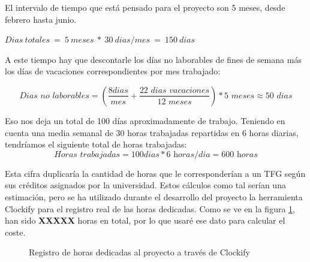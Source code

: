 El intervalo de tiempo que está pensado para el proyecto son 5 meses, desde febrero hasta junio. 

\begin{center}
    $Dias\ totales\ =\ 5\ meses\ *\ 30\ dias / mes\ =\ 150\ dias$    
\end{center}

A este tiempo hay que descontarle los días no laborables de fines de semana más los días de vacaciones correspondientes por mes trabajado:

\begin{equation*}
    \textit{Dias no laborables} = \left( \frac{8 \textit{dias}}{mes} + \frac{22 \textit{ dias vacaciones}}{12 \textit{ meses}}\right) * 5 \textit{ meses} \approx 50 \textit{ dias}
\end{equation*}

Eso nos deja un total de 100 días aproximadamente de trabajo. Teniendo en cuenta una media semanal de 30 horas trabajadas repartidas en 6 horas diarias, tendríamos el siguiente total de horas trabajadas:
\begin{equation*}
    \textit{Horas trabajadas} = 100 \textit{dias} * 6 \textit{ horas/dia} = 600 \textit{ horas}
\end{equation*}

Esta cifra duplicaría la cantidad de horas que le corresponderían a un TFG según sus créditos asignados por la universidad. Estos cálculos como tal serían una estimación, pero se ha utilizado durante el desarrollo del proyecto la herramienta Clockify para el registro real de las horas dedicadas. Como se ve en la figura \ref{fig:clockify}, han sido \textbf{XXXXX} horas en total,
por lo que usaré ese dato para calcular el coste.

\begin{figure}[h!]
    \caption{Registro de horas dedicadas al proyecto a través de Clockify}
    \label{fig:clockify}
\end{figure}

